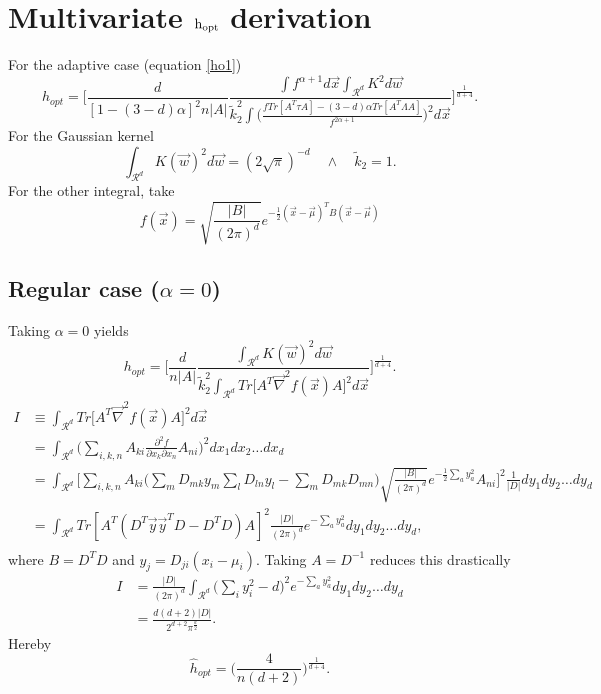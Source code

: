 \chapter{Multivariate $\rm h_{\rm opt}$ derivation}
\label{app:B}
For the adaptive case (equation \eqref{ho1})
\begin{equation}
	h_{opt}= \bigg[\frac{d}{[1-(3-d)\alpha]^2n|A|}\frac{\int f^{\alpha+1}d\vec{x}  \int_{\mathcal{R}^d} K^2d\vec{w}}{\tilde{k}_2^2\int \big(\frac{fTr[A^T\tau A]-(3-d)\alpha Tr[A^T\Lambda A]}{f^{2\alpha+1}}\big)^2d\vec{x}}\bigg]^{\frac{1}{d+4}}.
\end{equation}
For the Gaussian kernel
\begin{equation}
	\int_{\mathcal{R}^d}K(\vec{w})^2d\vec{w}=(2\sqrt{\pi})^{-d}\quad \wedge \quad \tilde{k}_2=1.
\end{equation}
For the other integral, take
\begin{equation}
	f(\vec{x})=\sqrt{\frac{|B|}{(2\pi)^d}}e^{-\frac{1}{2}(\vec{x}-\vec{\mu})^TB(\vec{x}-\vec{\mu})}
\end{equation}
\section{Regular case ($\alpha=0$)}
Taking $\alpha=0$ yields
\begin{equation}
	h_{opt}= \bigg[\frac{d}{n|A|}\frac{\int_{\mathcal{R}^d}K(\vec{w})^2d\vec{w}}{\tilde{k}_2^2\int_{\mathcal{R}^d}Tr\big[A^T\vec{\nabla}^2f(\vec{x})A\big]^2d\vec{x}}\bigg]^{\frac{1}{d+4}}.
	\label{hh1}
\end{equation}
\begin{equation}
	\begin{split}
		I&\equiv\int_{\mathcal{R}^d}Tr\big[A^T\vec{\nabla}^2f(\vec{x})A\big]^2d\vec{x}\\
		&=\int_{\mathcal{R}^d}\bigg(\sum_{i,k,n}A_{ki}\frac{\partial^2 f}{\partial x_k\partial x_n}A_{ni}\bigg)^2dx_1dx_2\dots dx_d\\
		&=\int_{\mathcal{R}^d}\bigg[\sum_{i,k,n}A_{ki}\bigg(\sum_mD_{mk}y_m\sum_lD_{ln}y_l-\sum_m D_{mk}D_{mn}\bigg)\sqrt{\frac{|B|}{(2\pi)^d}}e^{-\frac{1}{2}\sum_ay_a^2}A_{ni}\bigg]^2\frac{1}{|D|}dy_1dy_2\dots dy_d\\
		&=\int_{\mathcal{R}^d}Tr[A^T(D^T\vec{y}\vec{y}^TD-D^TD)A]^2\frac{|D|}{(2\pi)^d}e^{-\sum_ay_a^2}dy_1dy_2\dots dy_d,\\
	\end{split}
\end{equation}
where $B=D^TD$ and $y_j=D_{ji}(x_i-\mu_i)$. Taking $A=D^{-1}$ reduces this drastically
\begin{equation}
	\begin{split}
		I&=\frac{|D|}{(2\pi)^d}\int_{\mathcal{R}^d}\bigg(\sum_iy_i^2-d\bigg)^2e^{-\sum_ay_a^2}dy_1dy_2\dots dy_d\\
		&=\frac{d(d+2)|D|}{2^{d+2}\pi^{\frac{d}{2}}}.
		\label{si}
	\end{split}
\end{equation}
Hereby
\begin{equation}
	\hat{h}_{opt}= \bigg(\frac{4}{n(d+2)}\bigg)^\frac{1}{d+4}.
\end{equation}

